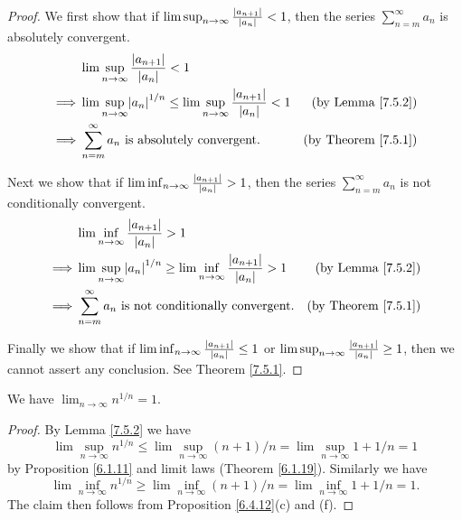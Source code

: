 \begin{proof}
    We first show that if \(\lim\sup_{n \to \infty} \frac{\abs*{a_{n + 1}}}{\abs*{a_n}} < 1\), then the series \(\sum_{n = m}^\infty a_n\) is absolutely convergent.
    \begin{align*}
                 & \lim\sup_{n \to \infty} \frac{\abs*{a_{n + 1}}}{\abs*{a_n}} < 1                                                                                   \\
        \implies & \lim\sup_{n \to \infty} \abs*{a_n}^{1 / n} \leq \lim\sup_{n \to \infty} \frac{\abs*{a_{n + 1}}}{\abs*{a_n}} < 1 & \text{(by Lemma \ref{7.5.2})}   \\
        \implies & \sum_{n = m}^\infty a_n \text{ is absolutely convergent}.                                                       & \text{(by Theorem \ref{7.5.1})}
    \end{align*}

    Next we show that if \(\lim\inf_{n \to \infty} \frac{\abs*{a_{n + 1}}}{\abs*{a_n}} > 1\), then the series \(\sum_{n = m}^\infty a_n\) is not conditionally convergent.
    \begin{align*}
                 & \lim\inf_{n \to \infty} \frac{\abs*{a_{n + 1}}}{\abs*{a_n}} > 1                                                                                   \\
        \implies & \lim\sup_{n \to \infty} \abs*{a_n}^{1 / n} \geq \lim\inf_{n \to \infty} \frac{\abs*{a_{n + 1}}}{\abs*{a_n}} > 1 & \text{(by Lemma \ref{7.5.2})}   \\
        \implies & \sum_{n = m}^\infty a_n \text{ is not conditionally convergent}.                                                & \text{(by Theorem \ref{7.5.1})}
    \end{align*}

    Finally we show that if \(\lim\inf_{n \to \infty} \frac{\abs*{a_{n + 1}}}{\abs*{a_n}} \leq 1\) or \(\lim\sup_{n \to \infty} \frac{\abs*{a_{n + 1}}}{\abs*{a_n}} \geq 1\), then we cannot assert any conclusion.
    See Theorem \ref{7.5.1}.
\end{proof}

\begin{proposition}\label{7.5.4}
    We have \(\lim_{n \to \infty} n^{1 / n} = 1\).
\end{proposition}

\begin{proof}
    By Lemma \ref{7.5.2} we have
    \[
        \lim\sup_{n \to \infty} n^{1 / n} \leq \lim\sup_{n \to \infty} (n + 1) / n = \lim\sup_{n \to \infty} 1 + 1 / n = 1
    \]
    by Proposition \ref{6.1.11} and limit laws (Theorem \ref{6.1.19}).
    Similarly we have
    \[
        \lim\inf_{n \to \infty} n^{1 / n} \geq \lim\inf_{n \to \infty} (n + 1) / n = \lim\inf_{n \to \infty} 1 + 1 / n = 1.
    \]
    The claim then follows from Proposition \ref{6.4.12}(c) and (f).
\end{proof}


